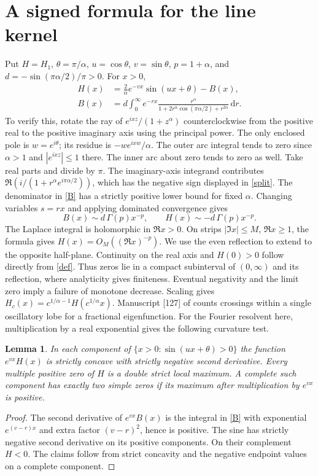 \documentclass[11pt]{article}
\theoremstyle{plain}\newtheorem{theorem}{Theorem}[section]\newtheorem{lemma}[theorem]{Lemma}\newtheorem{corollary}[theorem]{Corollary}\newtheorem{proposition}[theorem]{Proposition}
\newcommand{\dd}{\,\mathrm d}
\numberwithin{equation}{section}
\begin{document}
\section{A signed formula for the line kernel}\label{sec:line}
Put $H=H_1$, $\theta=\pi/\alpha$, $u=\cos\theta$, $v=\sin\theta$, $p=1+\alpha$, and $d=-\sin(\pi\alpha/2)/\pi>0$. For $x>0$,
\begin{align}
 H(x)&=\frac{2}{\alpha}e^{-vx}\sin(ux+\theta)-B(x),\label{split}\\
 B(x)&=d\int_0^\infty e^{-rx}
       \frac{r^\alpha}{1+2r^\alpha\cos(\pi\alpha/2)+r^{2\alpha}}\dd r .\label{B}
\end{align}
To verify this, rotate the ray of $e^{ixz}/(1+z^\alpha)$ counterclockwise from the positive real to the positive imaginary axis using the principal power. The only enclosed pole is $w=e^{i\theta}$; its residue is $-we^{ixw}/\alpha$. The outer arc integral tends to zero since $\alpha>1$ and $|e^{ixz}|\le1$ there. The inner arc about zero tends to zero as well. Take real parts and divide by $\pi$. The imaginary-axis integrand contributes $\Re(i/(1+r^\alpha e^{i\pi\alpha/2}))$, which has the negative sign displayed in \eqref{split}.
The denominator in \eqref{B} has a strictly positive lower bound for fixed $\alpha$. Changing variables $s=rx$ and applying dominated convergence gives
\begin{equation}\label{tail}
 B(x)\sim d\,\Gamma(p)x^{-p},\qquad H(x)\sim-d\,\Gamma(p)x^{-p}.
\end{equation}
The Laplace integral is holomorphic in $\Re x>0$. On strips $|\Im x|\le M$, $\Re x\ge1$, the formula gives $H(x)=O_M((\Re x)^{-p})$. We use the even reflection to extend to the opposite half-plane. Continuity on the real axis and $H(0)>0$ follow directly from \eqref{def}. Thus zeros lie in a compact subinterval of $(0,\infty)$ and its reflection, where analyticity gives finiteness. Eventual negativity and the limit zero imply a failure of monotone decrease. Scaling gives $H_c(x)=c^{1/\alpha-1}H(c^{1/\alpha}x)$.
Manuscript [127] of \cite{vmrc} counts crossings within a single oscillatory lobe for a fractional eigenfunction. For the Fourier resolvent here, multiplication by a real exponential gives the following curvature test.
\begin{lemma}\label{hump}
In each component of $\{x>0:\sin(ux+\theta)>0\}$ the function $e^{vx}H(x)$ is strictly concave with strictly negative second derivative. Every multiple positive zero of $H$ is a double strict local maximum. A complete such component has exactly two simple zeros if its maximum after multiplication by $e^{vx}$ is positive.
\end{lemma}
\begin{proof}
The second derivative of $e^{vx}B(x)$ is the integral in \eqref{B} with exponential $e^{(v-r)x}$ and extra factor $(v-r)^2$, hence is positive. The sine has strictly negative second derivative on its positive components. On their complement $H<0$. The claims follow from strict concavity and the negative endpoint values on a complete component.
\end{proof}
\end{document}
